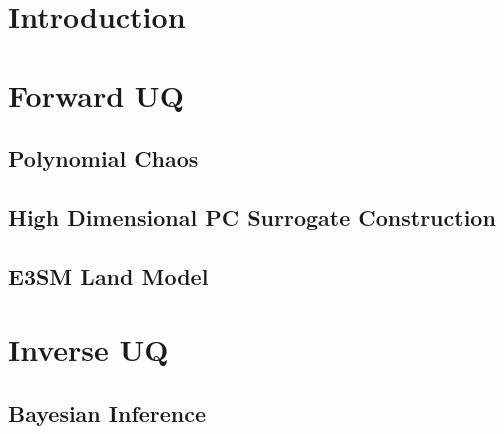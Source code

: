 \documentclass[compress]{beamer}
\begin{document}
\begin{frame}
  \titlepage
\end{frame}

%
\section[Intro]{Introduction}
%





\section[ForwardUQ]{Forward UQ}
%


\subsection[Polynomial Chaos]{Polynomial Chaos}




\subsection[High-D Challenge]{High Dimensional PC Surrogate Construction}





%
\subsection[ELM]{E3SM Land Model}



\section[InverseUQ]{Inverse UQ}
%

\subsection[Bayes]{Bayesian Inference}

\end{document}
